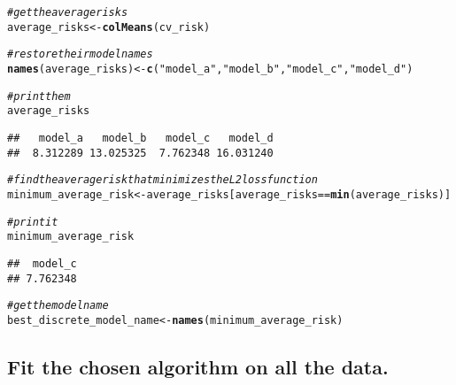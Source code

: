 \documentclass{article}\usepackage[]{graphicx}\usepackage[]{xcolor}
\makeatletter
\newcommand{\hlstr}[1]{\textcolor[rgb]{0.192,0.494,0.8}{#1}}%
\newcommand{\hlcom}[1]{\textcolor[rgb]{0.678,0.584,0.686}{\textit{#1}}}%
\newcommand{\hlopt}[1]{\textcolor[rgb]{0,0,0}{#1}}%
\newcommand{\hlstd}[1]{\textcolor[rgb]{0.345,0.345,0.345}{#1}}%
\newcommand{\hlkwb}[1]{\textcolor[rgb]{0.69,0.353,0.396}{#1}}%
\newcommand{\hlkwd}[1]{\textcolor[rgb]{0.737,0.353,0.396}{\textbf{#1}}}%
\newenvironment{kframe}{%
 \def\at@end@of@kframe{}%
 \ifinner\ifhmode%
  \def\at@end@of@kframe{\end{minipage}}%
  \begin{minipage}{\columnwidth}%
 \fi\fi%
 \def\FrameCommand##1{\hskip\@totalleftmargin \hskip-\fboxsep
 \colorbox{shadecolor}{##1}\hskip-\fboxsep
     \hskip-\linewidth \hskip-\@totalleftmargin \hskip\columnwidth}%
 \MakeFramed {\advance\hsize-\width
   \@totalleftmargin\z@ \linewidth\hsize
   \@setminipage}}%
 {\par\unskip\endMakeFramed%
 \at@end@of@kframe}
\newenvironment{knitrout}{}{} %
\makeatother
\begin{document}
\begin{knitrout}
\color{fgcolor}\begin{kframe}
\begin{alltt}
\hlcom{# get the average risks}
\hlstd{average_risks} \hlkwb{<-} \hlkwd{colMeans}\hlstd{(cv_risk)}

\hlcom{# restore their model names}
\hlkwd{names}\hlstd{(average_risks)} \hlkwb{<-} \hlkwd{c}\hlstd{(}\hlstr{"model_a"}\hlstd{,} \hlstr{"model_b"}\hlstd{,} \hlstr{"model_c"}\hlstd{,} \hlstr{"model_d"}\hlstd{)}

\hlcom{# print them}
\hlstd{average_risks}
\end{alltt}
\begin{verbatim}
##   model_a   model_b   model_c   model_d 
##  8.312289 13.025325  7.762348 16.031240
\end{verbatim}
\begin{alltt}
\hlcom{# find the average risk that minimizes the L2 loss function}
\hlstd{minimum_average_risk} \hlkwb{<-} \hlstd{average_risks[average_risks} \hlopt{==} \hlkwd{min}\hlstd{(average_risks)]}

\hlcom{# print it}
\hlstd{minimum_average_risk}
\end{alltt}
\begin{verbatim}
##  model_c 
## 7.762348
\end{verbatim}
\begin{alltt}
\hlcom{# get the model name}
\hlstd{best_discrete_model_name} \hlkwb{<-} \hlkwd{names}\hlstd{(minimum_average_risk)}
\end{alltt}
\end{kframe}
\end{knitrout}


  \subsection{Fit the chosen algorithm on all the data.}
  
\end{document}
